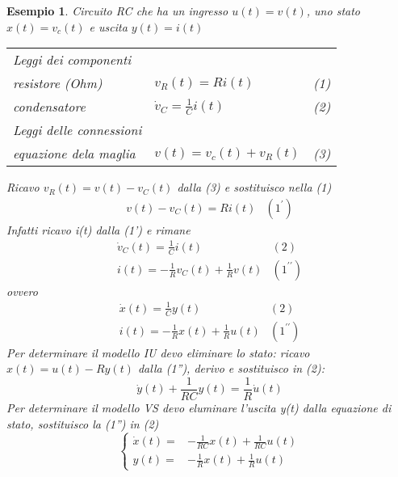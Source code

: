 \documentclass{book}
\newtheorem{esempio}{Esempio}
\begin{document}
  \begin{esempio}
    Circuito RC che ha un ingresso $u(t)=v(t)$, uno stato $x(t)=v_c(t)$ e uscita $y(t)=i(t)$
    \begin{table}[ht]
      \centering
      \begin{tabular}{llr}
        Leggi dei componenti \\
        resistore (Ohm) & $v_R(t)=R i (t)$ & (1)\\
        condensatore	& $\dot{v}_C=\frac{1}{C}i(t)$ & (2)\\
        Leggi delle connessioni \\
        equazione dela maglia&$v(t)=v_c(t)+v_R(t)$ & (3)
        \end{tabular}
      \end{table}
      Ricavo $v_R(t)=v(t)-v_C(t)$ dalla (3) e sostituisco nella (1)
      \begin{equation*}
        \begin{matrix}
          v(t)-v_C(t)=R i(t) & (1^\prime)
        \end{matrix}
      \end{equation*}
      Infatti ricavo i(t) dalla (1') e rimane
      \begin{equation*}
        \begin{matrix}
          \dot{v}_C(t)=\frac{1}{C}i(t) & (2)\\
          i(t)=-\frac{1}{R}v_C(t)+\frac{1}{R}v(t) & (1^{\prime\prime}) 
        \end{matrix}
      \end{equation*}
      ovvero
      \begin{equation*}
        \begin{matrix}
          \dot{x}(t)=\frac{1}{C}y(t) & (2)\\
          i(t)=-\frac{1}{R}x(t)+\frac{1}{R}u(t) & (1^{\prime\prime}) 
        \end{matrix}
      \end{equation*}
      Per determinare il modello IU devo eliminare lo stato: ricavo $x(t)=u(t)-R y(t)$ dalla (1''), derivo e sostituisco
      in (2):
      \begin{equation*}
	\boxed{\dot{y}(t)+\frac{1}{RC}y(t)=\frac{1}{R}\dot{u}(t)}
      \end{equation*}
      Per determinare il modello VS devo eluminare l'uscita y(t) dalla equazione di stato, sostituisco la (1'') in (2)
      \begin{equation*}
        \boxed{
        \begin{cases}
          \dot{x}(t)= & -\frac{1}{RC}x(t)+\frac{1}{RC} u(t)\\
          y(t)= & -\frac{1}{R} x(t)+\frac{1}{R}u(t)
        \end{cases}
        }
      \end{equation*}
      
  \end{esempio}
  
                        
\printindex
\end{document}
